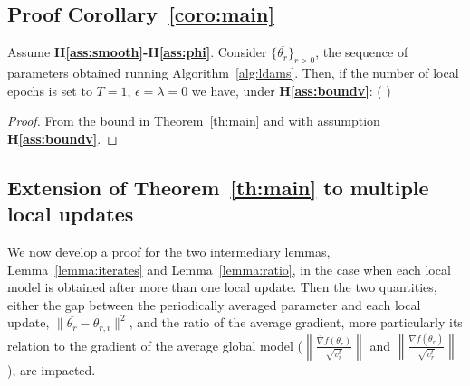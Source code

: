 \documentclass[11pt]{article}
\begin{document}
\subsection{Proof Corollary~\ref{coro:main}}

\begin{Corollary*}
Assume \textbf{H\ref{ass:smooth}-H\ref{ass:phi}}. Consider $\{\overline{\theta_r}\}_{r>0}$, the sequence of parameters obtained running Algorithm~\ref{alg:ldams}. Then, if the number of local epochs is set to $T=1$, $\epsilon = \lambda = 0$ we have, under \textbf{H\ref{ass:boundv}}:
\beq \notag
{} \EE{} \leq {}\left(  \right)
\eeq
\end{Corollary*}

\begin{proof}
From the bound in Theorem~\ref{th:main} and with assumption \textbf{H\ref{ass:boundv}}.
\end{proof}





\subsection{Extension of Theorem~\ref{th:main} to multiple local updates}\label{app:multiple}

We now develop a proof for the two intermediary lemmas, Lemma~\ref{lemma:iterates} and Lemma~\ref{lemma:ratio}, in the case when each local model is obtained after more than one local update.
Then the two quantities, either the gap between the periodically averaged parameter and each local update, \ie $\| \overline{\theta_r} - \theta_{r,i} \|^2$, and the ratio of the average gradient, more particularly its relation to the gradient of the average global model (\ie $\left\| \frac{\overline{\nabla}f(\theta_r)}{\sqrt{ v_r^t}} \right\|$ and $ \left\| \frac{\nabla f(\overline{\theta_r})}{\sqrt{ v_r^t}} \right\| $), are impacted.
\end{document}
